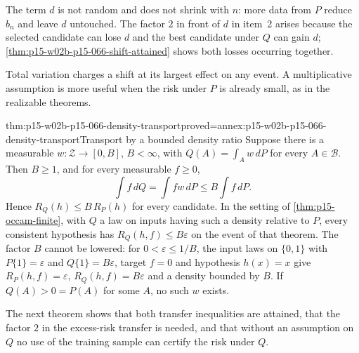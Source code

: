 The term \(d\) is not random and does not shrink with \(n\): more data
from \(P\) reduce \(b_n\) and leave \(d\) untouched. The factor \(2\) in
front of \(d\) in item~2 arises because the selected candidate can lose
\(d\) and the best candidate under \(Q\) can gain \(d\);
\cref{thm:p15-w02b-p15-066-shift-attained} shows both losses occurring
together.

Total variation charges a shift at its largest effect on any event. A
multiplicative assumption is more useful when the risk under \(P\) is
already small, as in the realizable theorems.

\begin{hbtheorem}{thm:p15-w02b-p15-066-density-transport}{proved=annex:p15-w02b-p15-066-density-transport}{Transport by a bounded density ratio}
Suppose there is a measurable \(w:\mathcal Z\to[0,B]\), \(B<\infty\),
with \(Q(A)=\int_Aw\,dP\) for every \(A\in\mathcal B\). Then \(B\geq1\),
and for every measurable \(f\geq0\),
\[
 \int f\,dQ=\int fw\,dP\leq B\int f\,dP .
\]
Hence \(R_Q(h)\leq B\,R_P(h)\) for every candidate. In the setting of
\cref{thm:p15-occam-finite}, with \(Q\) a law on inputs having such a
density relative to \(P\), every consistent hypothesis has
\(R_Q(h,f)\leq B\varepsilon\) on the event of that theorem.
The factor \(B\) cannot be lowered: for \(0<\varepsilon\leq1/B\), the
input laws on \(\{0,1\}\) with \(P\{1\}=\varepsilon\) and
\(Q\{1\}=B\varepsilon\), target \(f=0\) and hypothesis \(h(x)=x\) give
\(R_P(h,f)=\varepsilon\), \(R_Q(h,f)=B\varepsilon\) and a density
bounded by \(B\). If \(Q(A)>0=P(A)\) for some \(A\), no such \(w\)
exists.
\end{hbtheorem}

The next theorem shows that both transfer inequalities are attained, that
the factor \(2\) in the excess-risk transfer is needed, and that without
an assumption on \(Q\) no use of the training sample can certify the
risk under \(Q\).

